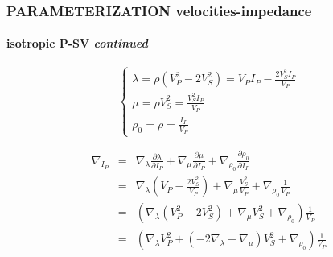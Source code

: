 \documentclass[9pt]{beamer}
\newcommand{\partderi}[2]{\frac{\partial#1}{\partial#2}}
\begin{document}
\begin{frame}
\begin{minipage}{\linewidth}
  \end{minipage} %
%     

\end{frame}

\begin{frame}\frametitle{PARAMETERIZATION velocities-impedance}
\framesubtitle{isotropic P-SV \textit{continued}}
  \begin{minipage}{\linewidth}
    \[\left\{ \begin{array}{l}
      \lambda = \rho (V_P^2-2V_S^2) = V_PI_P - \frac{2V_S^2I_P}{V_P} \\
      \mu    = \rho V_S^2 = \frac{V_S^2I_P}{V_P} \\
      \rho_0 = \rho = \frac{I_P}{V_P}
    \end{array} \right.\]
    
    \begin{eqnarray}
      \nabla_{I_P} &=& \nabla_\lambda \partderi{\lambda}{I_P} + \nabla_\mu \partderi{\mu}{I_P} + \nabla_{\rho_0} \partderi{\rho_0}{I_P} \nonumber\\
		   &=& \nabla_\lambda \left(V_P-\frac{2V_S^2}{V_P}\right) + \nabla_\mu \frac{V_S^2}{V_P} + \nabla_{\rho_0} \frac{1}{V_P} \nonumber\\
		   &=& \left( \nabla_\lambda (V_P^2-2V_S^2) + \nabla_\mu V_S^2 + \nabla_{\rho_0} \right) \frac{1}{V_P} \nonumber\\
		   &=& \left( \nabla_\lambda V_P^2 + (-2\nabla_\lambda + \nabla_\mu) V_S^2 + \nabla_{\rho_0} \right) \frac{1}{V_P} \nonumber
    \end{eqnarray}
  \end{minipage}
\end{frame}
\end{document}
